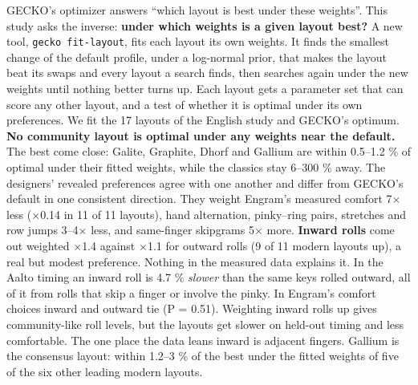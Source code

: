\documentclass{gecko-paper}
\begin{document}
\makepapertitle
\begin{paperabstract}
GECKO's optimizer answers “which layout is best under these weights”. This study asks the inverse: \textbf{under which weights is a given layout best?} A new tool, \texttt{gecko\ fit-layout}, fits each layout its own weights. It finds the smallest change of the default profile, under a log-normal prior, that makes the layout beat its swaps and every layout a search finds, then searches again
under the new weights until nothing better turns up. Each layout gets a parameter set that can score any other layout, and a test of whether it is optimal under its own preferences. We fit the 17 layouts of the English study and GECKO's optimum. \textbf{No community layout is optimal under any weights near the default.} The best come close: Galite, Graphite, Dhorf and Gallium are within 0.5–1.2
\% of optimal under their fitted weights, while the classics stay 6–300 \% away. The designers' revealed preferences agree with one another and differ from GECKO's default in one consistent direction. They weight Engram's measured comfort 7$\times$ less ($\times$0.14 in 11 of 11 layouts), hand alternation, pinky–ring pairs, stretches and row jumps 3–4$\times$ less, and same-finger skipgrams 5$\times$ more. \textbf{Inward
rolls} come out weighted $\times$1.4 against $\times$1.1 for outward rolls (9 of 11 modern layouts up), a real but modest preference. Nothing in the measured data explains it. In the Aalto timing an inward roll is 4.7 \% \emph{slower} than the same keys rolled outward, all of it from rolls that skip a finger or involve the pinky. In Engram's comfort choices inward and outward tie (P = 0.51). Weighting inward
rolls up gives community-like roll levels, but the layouts get slower on held-out timing and less comfortable. The one place the data leans inward is adjacent fingers. Gallium is the consensus layout: within 1.2–3 \% of the best under the fitted weights of five of the six other leading modern layouts.

\end{paperabstract}
\raggedright
\end{document}
